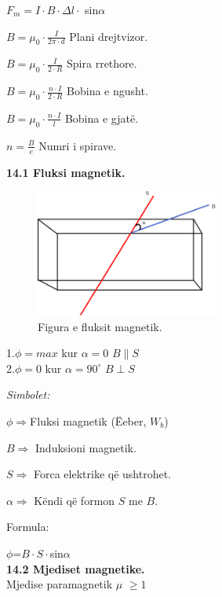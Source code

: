\documentclass[twocolumn]{article}
\begin{document}
	$F_m=I \cdot B \cdot \Delta l \cdot$ sin$\alpha$
	
	$B=\mu_0 \cdot \frac{I}{2 \pi \cdot d}$ Plani drejtvizor.
	
	$B=\mu_0 \cdot \frac{I}{2 \cdot R}$ Spira rrethore.
	
	$B=\mu_0 \cdot \frac{n \cdot I}{2 \cdot R}$ Bobina e ngusht.
	
	$B=\mu_0 \cdot \frac{n \cdot I}{l}$ Bobina e gjatë.
	
	$n=\frac{B}{e}$ Numri i spirave.
	
	\textbf{14.1 Fluksi magnetik.}
	
	\begin{figure}[h]
		\includegraphics[width=60mm]{Imazhet/goditesi.png}
		\caption{Figura e fluksit magnetik.}
		\label{fig:boat1}
	\end{figure}
	
	1.$\phi= max$ kur $\alpha=0$ $B \parallel S$\\
	
	
	
	2.$\phi= 0$ kur $\alpha=90^\circ$ $B \perp S$
	\begin{center}
		\textit{Simbolet:}
	\end{center}
	
	$\phi \Rightarrow$Fluksi magnetik (Ëeber, $W_b$)
	
	$B \Rightarrow$ Induksioni magnetik.
	
	$S \Rightarrow $ Forca elektrike që ushtrohet.
	
	$\alpha \Rightarrow $ Këndi që formon $S$ me $B$.
	
	\begin{center}
		Formula:
	\end{center}
	
	$\phi$=$B \cdot S \cdot $sin$\alpha$\\
	
	\textbf{14.2 Mjediset magnetike.}\\
	
	Mjedise paramagnetik $\mu$ $\geq  1$\\
	
\end{document}
